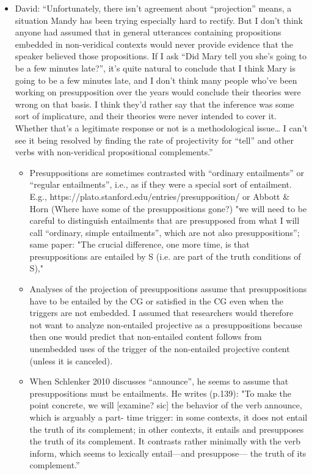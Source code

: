 \documentclass[11pt,fleqn]{article}
\newcommand{\6}{\mbox{$[\hspace*{-.6mm}[$}}
\newcommand{\9}{\mbox{$]\hspace*{-.6mm}]$}}
\begin{document}
\begin{itemize}
\begin{itemize}
\item David: ``Unfortunately, there isn’t agreement about  “projection” means, a situation Mandy has been trying especially hard to rectify. But I don’t think anyone had assumed that in general utterances containing propositions embedded in non-veridical contexts would never provide evidence that the speaker believed those propositions. If I ask “Did Mary tell you she’s going to be a few minutes late?”, it’s quite natural to conclude that I think Mary is going to be a few minutes late, and I don’t think many people who’ve been working on presupposition over the years would conclude their theories were wrong on that basis. I think they’d rather say that the inference was some sort of implicature, and their theories were never intended to cover it. Whether that’s a legitimate response or not is a methodological issue… I can’t see it being resolved by finding the rate of projectivity for “tell” and other verbs with non-veridical propositional complements.''

\begin{itemize}

\item Presuppositions are sometimes contrasted with “ordinary entailments” or “regular entailments”, i.e., as if they were a special sort of entailment. E.g., https://plato.stanford.edu/entries/presupposition/ or Abbott \& Horn (Where have some of the presuppositions gone?) "we will need to be careful to distinguish entailments that are presupposed from what I will call “ordinary, simple entailments”, which are not also presuppositions”; same paper: "The crucial difference, one more time, is that presuppositions are entailed by S (i.e. are part of the truth conditions of S),"

\item Analyses of the projection of presuppositions assume that presuppositions have to be entailed by the CG or satisfied in the CG even when the triggers are not embedded. I assumed that researchers would therefore not want to analyze non-entailed projective as a presuppositions because then one would predict that non-entailed content follows from unembedded uses of the trigger of the non-entailed projective content (unless it is canceled).

\item When Schlenker 2010 discusses “announce”, he seems to assume that presuppositions must be entailments. He writes (p.139): "To make the point concrete, we will [examine? sic] the behavior of the verb announce, which is arguably a part- time trigger: in some contexts, it does not entail the truth of its complement; in other contexts, it entails and presupposes the truth of its complement. It contrasts rather minimally with the verb inform, which seems to lexically entail—and presuppose— the truth of its complement.” 


\end{itemize}
\end{itemize}
\end{itemize}
\end{document}
